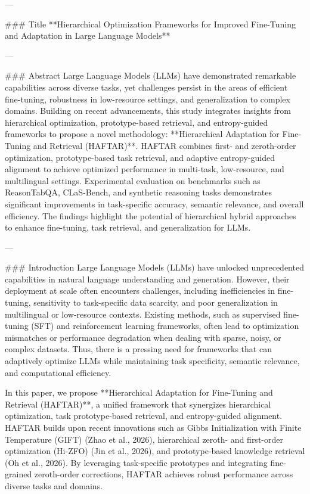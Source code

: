 ---

### Title
**Hierarchical Optimization Frameworks for Improved Fine-Tuning and Adaptation in Large Language Models**

---

### Abstract
Large Language Models (LLMs) have demonstrated remarkable capabilities across diverse tasks, yet challenges persist in the areas of efficient fine-tuning, robustness in low-resource settings, and generalization to complex domains. Building on recent advancements, this study integrates insights from hierarchical optimization, prototype-based retrieval, and entropy-guided frameworks to propose a novel methodology: **Hierarchical Adaptation for Fine-Tuning and Retrieval (HAFTAR)**. HAFTAR combines first- and zeroth-order optimization, prototype-based task retrieval, and adaptive entropy-guided alignment to achieve optimized performance in multi-task, low-resource, and multilingual settings. Experimental evaluation on benchmarks such as ReasonTabQA, CLaS-Bench, and synthetic reasoning tasks demonstrates significant improvements in task-specific accuracy, semantic relevance, and overall efficiency. The findings highlight the potential of hierarchical hybrid approaches to enhance fine-tuning, task retrieval, and generalization for LLMs.

---

### Introduction
Large Language Models (LLMs) have unlocked unprecedented capabilities in natural language understanding and generation. However, their deployment at scale often encounters challenges, including inefficiencies in fine-tuning, sensitivity to task-specific data scarcity, and poor generalization in multilingual or low-resource contexts. Existing methods, such as supervised fine-tuning (SFT) and reinforcement learning frameworks, often lead to optimization mismatches or performance degradation when dealing with sparse, noisy, or complex datasets. Thus, there is a pressing need for frameworks that can adaptively optimize LLMs while maintaining task specificity, semantic relevance, and computational efficiency.

In this paper, we propose **Hierarchical Adaptation for Fine-Tuning and Retrieval (HAFTAR)**, a unified framework that synergizes hierarchical optimization, task prototype-based retrieval, and entropy-guided alignment. HAFTAR builds upon recent innovations such as Gibbs Initialization with Finite Temperature (GIFT) (Zhao et al., 2026), hierarchical zeroth- and first-order optimization (Hi-ZFO) (Jin et al., 2026), and prototype-based knowledge retrieval (Oh et al., 2026). By leveraging task-specific prototypes and integrating fine-grained zeroth-order corrections, HAFTAR achieves robust performance across diverse tasks and domains.

